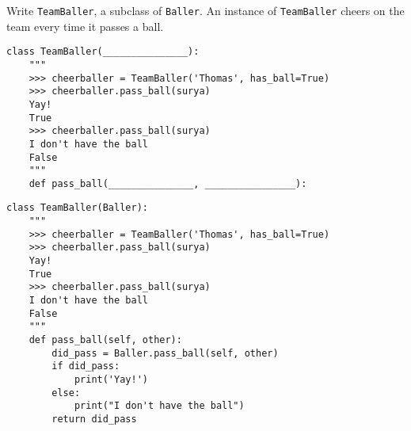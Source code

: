 \begin{blocksection}
\question Write \lstinline$TeamBaller$, a subclass of \lstinline$Baller$. An instance of \lstinline$TeamBaller$ cheers on the team every time it passes a ball.

\ifprintanswers\else
\begin{lstlisting}
class TeamBaller(_______________):
    """
    >>> cheerballer = TeamBaller('Thomas', has_ball=True)
    >>> cheerballer.pass_ball(surya)
    Yay!
    True
    >>> cheerballer.pass_ball(surya)
    I don't have the ball
    False
    """
    def pass_ball(_______________, ________________):
\end{lstlisting}
\fi

\begin{solution}[1in]
\begin{lstlisting}
class TeamBaller(Baller):
    """
    >>> cheerballer = TeamBaller('Thomas', has_ball=True)
    >>> cheerballer.pass_ball(surya)
    Yay!
    True
    >>> cheerballer.pass_ball(surya)
    I don't have the ball
    False
    """
    def pass_ball(self, other):
        did_pass = Baller.pass_ball(self, other)
        if did_pass:
            print('Yay!')
        else:
            print("I don't have the ball")
        return did_pass
\end{lstlisting}
\end{solution}
\end{blocksection}
